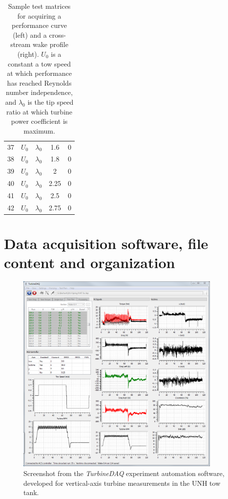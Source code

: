 \documentclass[12pt,letterpaper]{scrreprt}
\begin{document}
\begin{appendices}
\begin{table}[!ht]
{\begin{tabular}{c|c|c|c|c}
37  & $U_0$        & $\lambda_0$ & 1.6   & 0   \\
38  & $U_0$        & $\lambda_0$ & 1.8   & 0   \\
39  & $U_0$        & $\lambda_0$ & 2     & 0   \\
40  & $U_0$        & $\lambda_0$ & 2.25  & 0   \\
41  & $U_0$        & $\lambda_0$ & 2.5   & 0   \\
42  & $U_0$        & $\lambda_0$ & 2.75  & 0
\end{tabular}}
\caption{Sample test matrices for acquiring a performance curve (left) and a
cross-stream wake profile (right). $U_0$ is a constant a tow speed at which
performance has reached Reynolds number independence, and $\lambda_0$ is the tip
speed ratio at which turbine power coefficient is maximum.}
\label{tab-test_section}
\end{table}


\chapter{Data acquisition software, file content and organization}

\begin{figure}[ht]
\centering
\includegraphics[width=0.9\textwidth]{Figures/TurbineDAQ}
\caption{Screenshot from the \textit{TurbineDAQ} experiment automation software,
developed for vertical-axis turbine measurements in the UNH tow tank.}
\label{fig-turbinedaq}
\end{figure}



\end{appendices}
\end{document}
